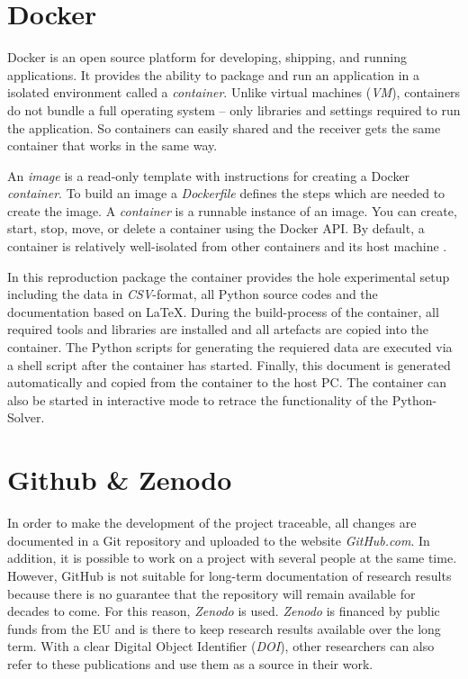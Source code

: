 \documentclass{article}
\begin{document}
\begin{multicols}{2}
\section{Docker} \label{sec:Docker}
Docker is an open source platform for developing, shipping, and running applications. It provides the ability to package and run an application in a isolated environment called a \textit{container}. Unlike virtual machines (\textit{VM}), containers do not bundle a full operating system -- only libraries and settings required to run the application. So containers can easily shared and the receiver gets the same container that works in the same way.

An \textit{image} is a read-only template with instructions for creating a Docker \textit{container}. To build an image a \textit{Dockerfile} defines the steps which are needed to create the image. A \textit{container} is a runnable instance of an image. You can create, start, stop, move, or delete a container using the Docker API. By default, a container is relatively well-isolated from other containers and its host machine \cite{Docker}. 

In this reproduction package the container provides the hole experimental setup including the data in \textit{CSV}-format, all Python source codes and the documentation based on \LaTeX. During the build-process of the container, all required tools and libraries are installed and all artefacts are copied into the container. The Python scripts for generating the requiered data are executed via a shell script after the container has started. Finally, this document is generated automatically and copied from the container to the host PC. The container can also be started in interactive mode to retrace the functionality of the Python-Solver.

\section{Github \& Zenodo}
In order to make the development of the project traceable, all changes are documented in a Git repository and uploaded to the website \textit{GitHub.com}. In addition, it is possible to work on a project with several people at the same time. However, GitHub is not suitable for long-term documentation of research results because there is no guarantee that the repository will remain available for decades to come. For this reason, \textit{Zenodo} is used.
\textit{Zenodo} \cite{zenodo} is financed by public funds from the EU and is there to keep research results available over the long term. With a clear Digital Object Identifier (\textit{DOI}), other researchers can also refer to these publications and use them as a source in their work.



\end{multicols}
\end{document}

